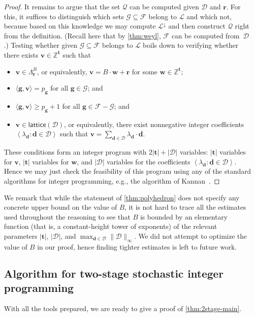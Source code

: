\documentclass{theoretics}
\renewcommand{\geq}{\geqslant}
\newcommand{\Dd}{\mathcal{D}}
\newcommand{\Z}{\mathbb{Z}}
\newcommand{\tup}[1]{{\mathbf{#1}}}
\newcommand{\ww}{\tup w}
\newcommand{\tv}{\tup t}
\renewcommand{\gg}{\tup g}
\newcommand{\rr}{\tup r}
\newcommand{\dd}{\tup d}
\newcommand{\myvv}{\tup v} %
\newcommand{\mset}[1]{\left\langle #1\right\rangle}
\newcommand{\Qq}{\mathcal{Q}}
\newcommand{\Ff}{\mathcal{F}}
\newcommand{\Gg}{\mathcal{G}}
\newcommand{\Ss}{\mathscr{L}}
\newcommand{\sca}[2]{\langle #1,#2\rangle}
\renewcommand{\setminus}{-}
\newcommand{\lattice}{\mathsf{lattice}}
\begin{document}
\begin{proof}
\medskip

It remains to argue that the set $\Qq$ can be computed given $\Dd$ and $\rr$. For this, it suffices to distinguish which sets $\Gg\subseteq \Ff$ belong to $\Ss$ and which not, because based on this knowledge we may compute $\Ss^{\downarrow}$ and then construct $\Qq$ right from the definition. (Recall here that by \cref{thm:weyl}, $\Ff$ can be computed from~$\Dd$.) Testing whether given $\Gg\subseteq \Ff$ belongs to $\Ss$ boils down to verifying whether there exists $\myvv\in \Z^\tv$ such that
\begin{itemize}[nosep]
 \item $\myvv\in \Lambda_\rr^B$, or equivalently, $\myvv=B\cdot \ww+\rr$ for some $\ww\in \Z^\tv$;
 \item $\sca{\gg}{\myvv}=p_\gg$ for all $\gg\in \Gg$; and
 \item $\sca{\gg}{\myvv}\geq p_\gg+1$ for all $\gg\in \Ff\setminus \Gg$; and
 \item $\myvv\in \lattice(\Dd)$, or equivalently, there exist nonnegative integer coefficients $\mset{\lambda_\dd\colon \dd\in \Dd}$ such that $\myvv=\sum_{\dd\in \Dd} \lambda_\dd\cdot \dd$.
\end{itemize}
These conditions form an integer program with $2|\tv|+|\Dd|$ variables: $|\tv|$ variables for $\myvv$, $|\tv|$ variables for $\ww$, and $|\Dd|$ variables for the coefficients $\mset{\lambda_\dd\colon \dd\in \Dd}$. Hence we may just check the feasibility of this program using any of the standard algorithms for integer programming, e.g., the algorithm of Kannan~\cite{kannan1987minkowski}.
\end{proof}

We remark that while the statement of \cref{thm:polyhedron} does not specify any concrete upper bound on the value of $B$, it is not hard to trace all the estimates used throughout the reasoning to see that $B$ is bounded by an elementary function (that is, a constant-height tower of exponents) of the relevant parameters $|\tv|$, $|\Dd|$, and $\max_{\dd\in \Dd}\|\Dd\|_\infty$. We did not attempt to optimize the value of $B$ in our proof, hence finding tighter estimates is left to future work.

\subsection{Algorithm for two-stage stochastic integer programming}

With all the tools prepared, we are ready to give a proof of \cref{thm:2stage-main}.
\end{document}
